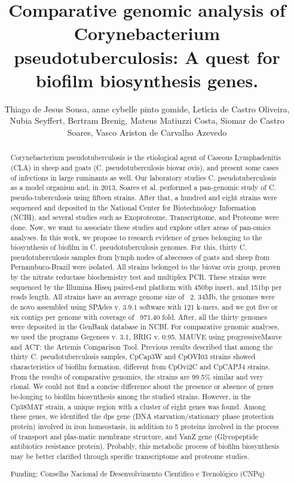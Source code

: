 \documentclass[twoside]{article}
\title{\vspace{-15mm}\fontsize{24pt}{10pt}\selectfont\textbf{ Comparative genomic analysis of Corynebacterium pseudotuberculosis: A quest for biofilm biosynthesis genes. }} %
\author{ Thiago de Jesus Sousa, anne cybelle pinto gomide, Let\'{\i}cia de Castro Oliveira, Nubia Seyffert, Bertram Brenig, Mateus Matiuzzi Costa, Siomar de Castro Soares, Vasco Ariston de Carvalho Azevedo }
\affil{ University G\"ottingen }
\date{}
\begin{document}
  
  
  \maketitle %
  
  
  \thispagestyle{fancy} %
  
  
  \begin{abstract}
  Corynebacterium pseudotuberculosis is the etiological agent of Caseous Lymphadenitis (CLA) in sheep and goats (C. pseudotuberculosis biovar ovis),  and present some cases of infections in large ruminants as well. Our laboratory studies C. pseudotuberculosis as a model organism and,  in 2013,  Soares et al. performed a pan-genomic study of C. pseudo-tuberculosis using fifteen strains. After that,  a hundred and eight strains were sequenced and deposited in the National Center for Biotechnology Information (NCBI),  and several studies such as Exoproteome,  Transcriptome,  and Proteome were done. Now,  we want to associate these studies and explore other areas of pan-omics analyses. In this work,  we propose to research evidence of genes belonging to the biosynthesis of biofilm in C. pseudotuberculosis genomes. For this,  thirty C. pseudotuberculosis samples from lymph nodes of abscesses of goats and sheep from Pernambuco-Brazil were isolated. All strains belonged to the biovar ovis group,  proven by the nitrate reductase biochemistry test and multiplex PCR. These strains were sequenced by the Illumina Hiseq paired-end platform with 450bp insert,  and 151bp per reads length. All strains have an average genome size of ~2, 34Mb,  the genomes were de novo assembled using SPAdes v. 3.9.1 software with 121 k-mers,  and we got five or six contigs per genome with coverage of ~971.40 fold. After,  all the thirty genomes were deposited in the GenBank database in NCBI. For comparative genomic analyses,  we used the programs Gegenees v. 3.1,  BRIG v. 0.95,  MAUVE using progressiveMauve and ACT: the Artemis Comparison Tool. Previous results described that among the thirty C. pseudotuberculosis samples,  CpCap3W and CpOVI03 strains showed characteristics of biofilm formation,  different from CpOvi2C and CpCAPJ4 strains. From the results of comparative genomics,  the strains are 99.5\% similar and very clonal. We could not find a concise difference about the presence or absence of genes be-longing to biofilm biosynthesis among the studied strains. However,  in the Cp38MAT strain,  a unique region with a cluster of eight genes was found. Among these genes,  we identified the dps gene (DNA starvation/stationary phase protection protein) involved in iron homeostasis,  in addition to 5 proteins involved in the process of transport and plas-matic membrane structure,  and VanZ gene (Glycopeptide antibiotics resistance protein). Probably,  this metabolic process of biofilm biosynthesis may be better clarified through specific transcriptome and proteome studies.
  
  Funding: Conselho Nacional de Desenvolvimento Cient\'{\i}fico e Tecnol\'ogico (CNPq) \\ 
  \end{abstract}
  
\end{document}
